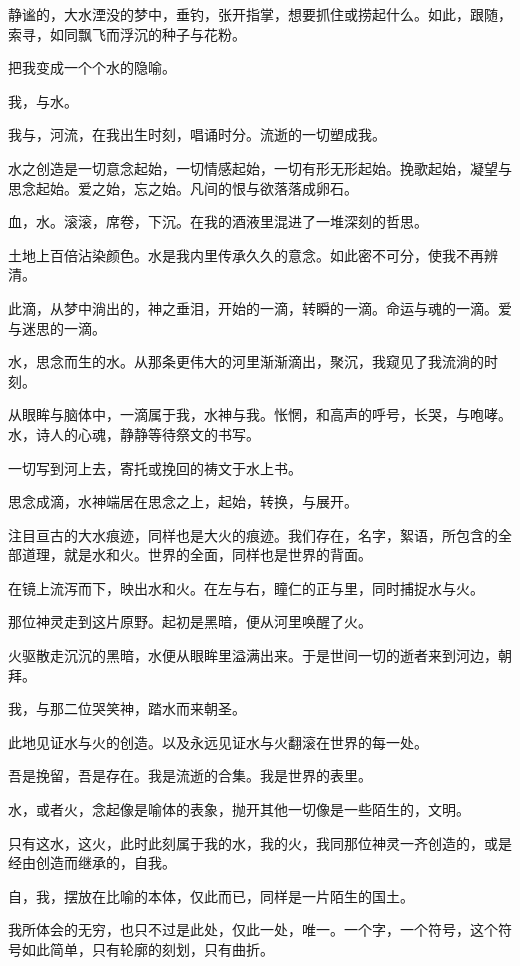 \documentclass[UTF8]{article}
\begin{document}
\par 静谧的，大水湮没的梦中，垂钓，张开指掌，想要抓住或捞起什么。如此，跟随，索寻，如同飘飞而浮沉的种子与花粉。
\par 把我变成一个个水的隐喻。
\par 我，与水。
\par 我与，河流，在我出生时刻，唱诵时分。流逝的一切塑成我。
\par 水之创造是一切意念起始，一切情感起始，一切有形无形起始。挽歌起始，凝望与思念起始。爱之始，忘之始。凡间的恨与欲落落成卵石。
\par 血，水。滚滚，席卷，下沉。在我的酒液里混进了一堆深刻的哲思。
\par 土地上百倍沾染颜色。水是我内里传承久久的意念。如此密不可分，使我不再辨清。
\par 此滴，从梦中淌出的，神之垂泪，开始的一滴，转瞬的一滴。命运与魂的一滴。爱与迷思的一滴。
\par 水，思念而生的水。从那条更伟大的河里渐渐滴出，聚沉，我窥见了我流淌的时刻。
\par 从眼眸与脑体中，一滴属于我，水神与我。怅惘，和高声的呼号，长哭，与咆哮。水，诗人的心魂，静静等待祭文的书写。
\par 一切写到河上去，寄托或挽回的祷文于水上书。
\\[0.6cm]
\par 思念成滴，水神端居在思念之上，起始，转换，与展开。
\par 注目亘古的大水痕迹，同样也是大火的痕迹。我们存在，名字，絮语，所包含的全部道理，就是水和火。世界的全面，同样也是世界的背面。
\par 在镜上流泻而下，映出水和火。在左与右，瞳仁的正与里，同时捕捉水与火。
\par 那位神灵走到这片原野。起初是黑暗，便从河里唤醒了火。
\par 火驱散走沉沉的黑暗，水便从眼眸里溢满出来。于是世间一切的逝者来到河边，朝拜。
\par 我，与那二位哭笑神，踏水而来朝圣。
\par 此地见证水与火的创造。以及永远见证水与火翻滚在世界的每一处。
\par 吾是挽留，吾是存在。我是流逝的合集。我是世界的表里。
\par 水，或者火，念起像是喻体的表象，抛开其他一切像是一些陌生的，文明。
\par 只有这水，这火，此时此刻属于我的水，我的火，我同那位神灵一齐创造的，或是经由创造而继承的，自我。
\par 自，我，摆放在比喻的本体，仅此而已，同样是一片陌生的国土。
\par 我所体会的无穷，也只不过是此处，仅此一处，唯一。一个字，一个符号，这个符号如此简单，只有轮廓的刻划，只有曲折。
\end{document}
